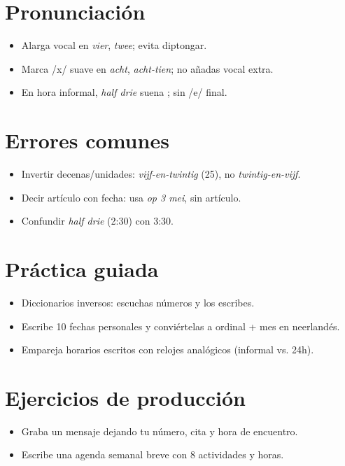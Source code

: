 \section{Pronunciación}
\begin{itemize}[leftmargin=*]
	\item Alarga vocal en \textit{vier}, \textit{twee}; evita diptongar.
	\item Marca /x/ suave en \textit{acht}, \textit{acht-tien}; no añadas vocal extra.
	\item En hora informal, \textit{half drie} suena ; sin /e/ final.
\end{itemize}

\section{Errores comunes}
\begin{itemize}[leftmargin=*]
	\item Invertir decenas/unidades: \textit{vijf-en-twintig} (25), no \textit{twintig-en-vijf}.
	\item Decir artículo con fecha: usa \textit{op 3 mei}, sin artículo.
	\item Confundir \textit{half drie} (2:30) con 3:30.
\end{itemize}

\section{Práctica guiada}
\begin{itemize}[leftmargin=*]
	\item Diccionarios inversos: escuchas números y los escribes.
	\item Escribe 10 fechas personales y conviértelas a ordinal + mes en neerlandés.
	\item Empareja horarios escritos con relojes analógicos (informal vs. 24h).
\end{itemize}

\section{Ejercicios de producción}
\begin{itemize}[leftmargin=*]
	\item Graba un mensaje dejando tu número, cita y hora de encuentro.
	\item Escribe una agenda semanal breve con 8 actividades y horas.
\end{itemize}

